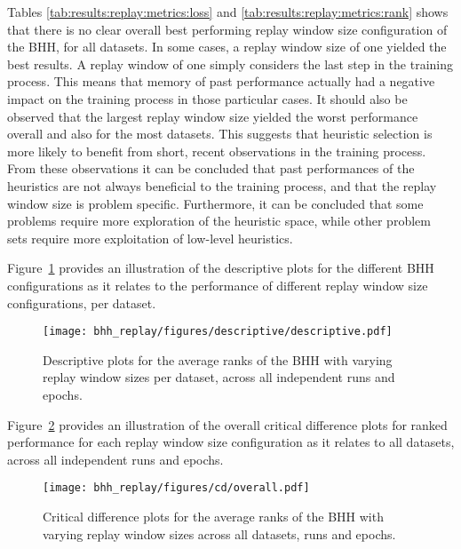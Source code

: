 Tables \ref{tab:results:replay:metrics:loss} and \ref{tab:results:replay:metrics:rank} shows that there is no clear overall best performing replay window size configuration of the \acs{BHH}, for all datasets. In some cases, a replay window size of one yielded the best results. A replay window of one simply considers the last step in the training process. This means that memory of past performance actually had a negative impact on the training process in those particular cases. It should also be observed that the largest replay window size yielded the worst performance overall and also for the most datasets. This suggests that heuristic selection is more likely to benefit from short, recent observations in the training process. From these observations it can be concluded that past performances of the heuristics are not always beneficial to the training process, and that the replay window size is problem specific. Furthermore, it can be concluded that some problems require more exploration of the heuristic space, while other problem sets require more exploitation of low-level heuristics.

Figure~\ref{fig:results:replay:descriptive:descriptive} provides an illustration of the descriptive plots for the different \acs{BHH} configurations as it relates to the performance of different replay window size configurations, per dataset.

\begin{figure}[htb]
      \centering
      \texttt{[image: bhh\_replay/figures/descriptive/descriptive.pdf]}
      \caption{Descriptive plots for the average ranks of the \acs{BHH} with varying replay window sizes per dataset, across all independent runs and epochs.}
      \label{fig:results:replay:descriptive:descriptive}
\end{figure}

Figure~\ref{fig:results:replay:descriptive:cd} provides an illustration of the overall critical difference plots for ranked performance for each replay window size configuration as it relates to all datasets, across all independent runs and epochs.

\begin{figure}[htb]
      \centering
      \texttt{[image: bhh\_replay/figures/cd/overall.pdf]}
      \caption{Critical difference plots for the average ranks of the \acs{BHH} with varying replay window sizes across all datasets, runs and epochs.}
      \label{fig:results:replay:descriptive:cd}
\end{figure}

